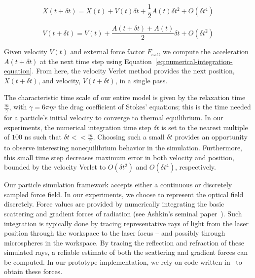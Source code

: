 \begin{equation}
 \label{eq:velocity-verlet-integration-position}
 X(t + \delta t) = X(t) + V(t)\delta t + \frac{1}{2} A(t) \delta t^2 + O(\delta
t^4)
\end{equation}

\begin{equation}
 \label{eq:velocity-verlet-integration-velocity}
 V(t + \delta t) = V(t) + \frac{A(t + \delta t) + A(t)}{2} \delta t + O(\delta
t^2)
\end{equation}

Given velocity $V(t)$ and external force factor $F_{ext}$, we compute the acceleration
$A(t + \delta t )$ at the next time step using
Equation~\ref{eq:numerical-integration-equation}. From here, the
velocity Verlet method provides the next position, $X(t + \delta t)$,
and velocity, $V(t + \delta t)$, in a single pass.


The characteristic time scale of our entire model is given by the
relaxation time $\frac{m}{\gamma}$, with $\gamma = 6 \pi \eta r$ the drag
coefficient of Stokes' equations; this is the time needed for a particle's
initial velocity to converge to thermal equilibrium.  In our experiments, the
numerical integration time step $\delta t$ is set to the nearest multiple of
$100$ ns such that $\delta t << \frac{m}{\gamma}$. Choosing such a small $\delta
t$ provides an opportunity to observe interesting nonequilibrium behavior in the
simulation.  Furthermore, this small time step decreases maximum error in both
velocity and position, bounded by the velocity Verlet to $O(\delta t^2)$ and
$O(\delta t^4)$, respectively.

Our particle simulation framework accepts either a continuous or discretely
sampled force field.  In our experiments, we choose to represent the optical
field discretely.  Force values are provided by
numerically integrating the basic scattering and gradient forces of
radiation (see Ashkin's seminal paper~\cite{ashkin1986observation}).  Such
integration is
typically done by tracing representative rays of light from the laser
position through the workspace to the laser focus -- and possibly
through microspheres in the workspace.  By tracing the reflection and
refraction of these simulated rays, a reliable estimate of both the
scattering and gradient forces can be computed.  In our prototype
implementation, we rely on code written
in~\cite{banerjee2009generating} to obtain these forces.

